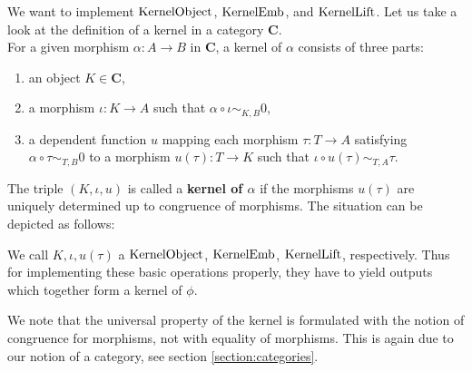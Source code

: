 \begin{example}
 We want to implement $\mathrm{KernelObject}$, $\mathrm{KernelEmb}$, and $\mathrm{KernelLift}$.
 Let us take a look at the definition of a kernel in a category $\mathbf{C}$. \\
 For a given morphism $\alpha: A \rightarrow B$ in $\mathbf{C}$, a kernel of $\alpha$ consists of three parts:
 \begin{enumerate}
  \item an object $K \in \mathbf{C}$,
  \item a morphism $\iota: K \rightarrow A$ such that $\alpha \circ \iota \sim_{K,B} 0$,
  \item a dependent function $u$ mapping each morphism $\tau: T \rightarrow A$ satisfying $\alpha \circ \tau \sim_{T,B} 0$ to
  a morphism $u(\tau): T \rightarrow K$ such that $\iota \circ u( \tau ) \sim_{T,A} \tau$. 
 \end{enumerate}
 The triple $( K, \iota, u )$ is called a \textbf{kernel of $\alpha$} if the morphisms $u( \tau )$ are uniquely determined up to
 congruence of morphisms. The situation can be depicted as follows:
 
 \begin{center}
\end{center}
 
 We call $K, \iota, u( \tau ) $ a $\mathrm{KernelObject}$, $\mathrm{KernelEmb}$, $\mathrm{KernelLift}$, respectively.
 Thus for implementing these basic operations properly, they have to yield outputs which together form a kernel of $\phi$.
\end{example}

\begin{remark}
 We note that the universal property of the kernel is formulated with the notion of congruence for morphisms,
 not with equality of morphisms. This is again due to our notion of a category, see section \ref{section:categories}.
\end{remark}


